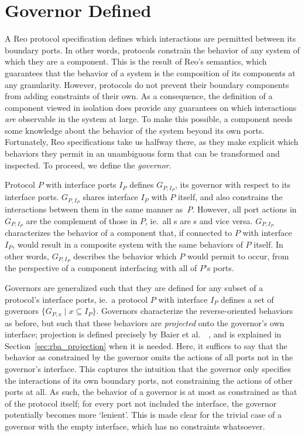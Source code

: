\section{Governor Defined}
\label{sec:governor_defined}
A Reo protocol specification defines which interactions are permitted between its boundary ports. In other words, protocols constrain the behavior of any system of which they are a component. This is the result of Reo's semantics, which 
guarantees that the behavior of a system is the composition of its components at any granularity. However, protocols do not prevent their boundary components from adding constraints of their own. As a consequence, the definition of a component viewed in isolation does provide any guarantees on which interactions \textit{are} observable in the system at large. To make this possible, a component needs some knowledge about the behavior of the system beyond its own ports. Fortunately, Reo specifications take us halfway there, as they make explicit which behaviors they permit in an unambiguous form that can be transformed and inspected. To proceed, we define the \textit{governor}.

Protocol $P$ with interface ports $I_P$ defines $G_{P,I_P}$, its governor with respect to its interface ports. $G_{P,I_P}$ shares interface $I_P$ with $P$ itself, and also constrains the interactions between them in the same manner as~$P$. However, all port actions in $G_{P,I_P}$ are the complement of those in $P$, ie.\ all s are s and vice versa. $G_{P,I_P}$ characterizes the behavior of a component that, if connected to $P$ with interface $I_P$, would result in a composite system with the same behaviors of $P$ itself. In other words, $G_{P,I_P}$ describes the behavior which $P$ would permit to occur, from the perspective of a component interfacing with all of $P$'s ports.

Governors are generalized such that they are defined for any subset of a protocol's interface ports, ie.\ a protocol $P$ with interface $I_P$ defines a set of governors $\{G_{P,x} \; | \; x\subseteq I_P\}$. Governors characterize the reverse-oriented behaviors as before, but such that these behaviors are \textit{projected} onto the governor's own interface; projection is defined precisely by Baier et al.\ ~\cite{baier2006modeling}, and is explained in Section~\ref{sec:rba_projection} when it is needed. Here, it suffices to say that the behavior as constrained by the governor omits the actions of all ports not in the governor's interface. This captures the intuition that the governor only specifies the interactions of its own boundary ports, not constraining the actions of other ports at all. As such, the behavior of a governor is at most as constrained as that of the protocol itself; for every port not included the interface, the governor potentially becomes more `lenient'. This is made clear for the trivial case of a governor with the empty interface, which has no constraints whatsoever.

